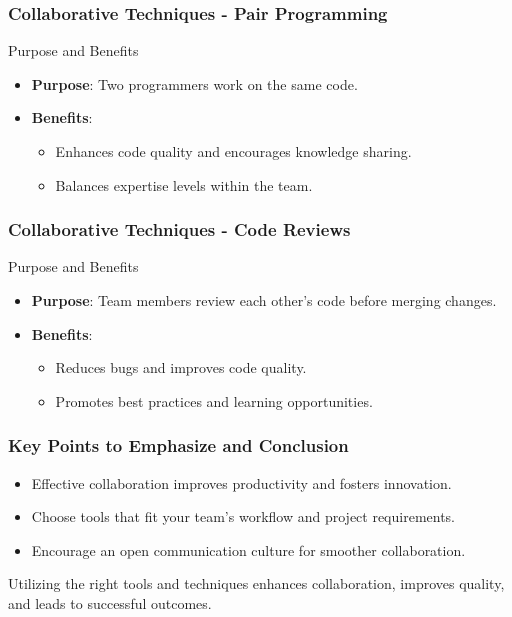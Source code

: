 \documentclass{beamer}
\begin{document}
\begin{frame}[fragile]
    \frametitle{Collaborative Techniques - Pair Programming}
    \begin{block}{Purpose and Benefits}
        \begin{itemize}
            \item \textbf{Purpose}: Two programmers work on the same code.
            \item \textbf{Benefits}:
            \begin{itemize}
                \item Enhances code quality and encourages knowledge sharing.
                \item Balances expertise levels within the team.
            \end{itemize}
        \end{itemize}
    \end{block}
\end{frame}

\begin{frame}[fragile]
    \frametitle{Collaborative Techniques - Code Reviews}
    \begin{block}{Purpose and Benefits}
        \begin{itemize}
            \item \textbf{Purpose}: Team members review each other's code before merging changes.
            \item \textbf{Benefits}:
            \begin{itemize}
                \item Reduces bugs and improves code quality.
                \item Promotes best practices and learning opportunities.
            \end{itemize}
        \end{itemize}
    \end{block}
\end{frame}

\begin{frame}[fragile]
    \frametitle{Key Points to Emphasize and Conclusion}
    \begin{itemize}
        \item Effective collaboration improves productivity and fosters innovation.
        \item Choose tools that fit your team's workflow and project requirements.
        \item Encourage an open communication culture for smoother collaboration.
    \end{itemize}
    
    Utilizing the right tools and techniques enhances collaboration, improves quality, and leads to successful outcomes.
\end{frame}
\end{document}
